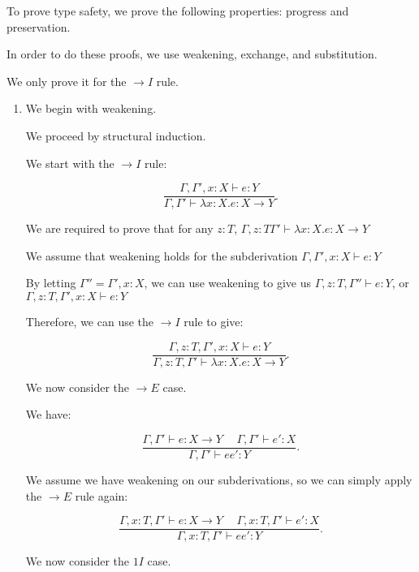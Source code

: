 



To prove type safety, we prove the following properties: progress and preservation.

In order to do these proofs, we use weakening, exchange, and substitution.

We only prove it for the $\rightarrow I$ rule.

  \begin{enumerate}
    \item
      We begin with weakening.

      We proceed by structural induction.

      We start with the $\rightarrow I$ rule:

      \[
        \frac{\Gamma,\Gamma', x : X \vdash e : Y}{\Gamma,\Gamma' \vdash \lambda x : X. e : X \rightarrow Y}
      .\] 

      We are required to prove that for any $z : T$, $\Gamma, z:T \Gamma' \vdash \lambda x : X. e : X \rightarrow Y$

      We assume that weakening holds for the subderivation  $\Gamma, \Gamma', x : X \vdash e : Y$

      By letting $\Gamma'' = \Gamma', x : X$, we can use weakening to give us $\Gamma, z : T, \Gamma'' \vdash e : Y$, or $\Gamma, z : T, \Gamma', x : X \vdash e : Y$

      Therefore, we can use the $\rightarrow I$ rule to give:

      \[
        \frac{\Gamma, z : T, \Gamma', x : X \vdash e : Y}{\Gamma, z : T, \Gamma' \vdash \lambda x: X. e : X \rightarrow Y}
      .\] 

      We now consider the $\rightarrow E$ case.

      We have:

      \[
        \frac{\Gamma,\Gamma' \vdash e : X \rightarrow Y \hspace{15pt} \Gamma, \Gamma' \vdash e' : X}{\Gamma, \Gamma' \vdash e e' : Y}
      .\] 

      We assume we have weakening on our subderivations, so we can simply apply the $\rightarrow E$ rule again:

      \[
        \frac{\Gamma, x : T, \Gamma' \vdash e : X \rightarrow Y \hspace{15pt} \Gamma, x : T, \Gamma' \vdash e' : X}{\Gamma, x : T, \Gamma' \vdash e e' : Y}
      .\] 

      We now consider the $1I$ case.


\end{enumerate}
